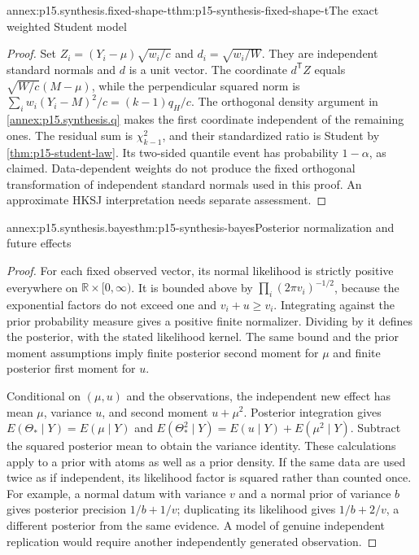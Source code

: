 \begin{annexitem}{annex:p15.synthesis.fixed-shape-t}{thm:p15-synthesis-fixed-shape-t}{The exact weighted Student model}
\begin{proof}
Set \(Z_i=(Y_i-\mu)\sqrt{w_i/c}\) and
\(d_i=\sqrt{w_i/W}\). They are independent standard normals and \(d\)
is a unit vector. The coordinate \(d^{\mathsf T}Z\) equals
\(\sqrt{W/c}(M-\mu)\), while the perpendicular squared norm is
\(\sum_iw_i(Y_i-M)^2/c=(k-1)q_H/c\).
The orthogonal density argument in \ref{annex:p15.synthesis.q} makes
the first coordinate independent of the remaining ones. The residual sum
is \(\chi^2_{k-1}\), and their standardized ratio is Student by
\ref{thm:p15-student-law}. Its two-sided quantile event has probability
\(1-\alpha\), as claimed. Data-dependent weights do not produce the
fixed orthogonal transformation of independent standard normals used in this
proof. An approximate HKSJ interpretation needs separate assessment.
\end{proof}
\end{annexitem}

\begin{annexitem}{annex:p15.synthesis.bayes}{thm:p15-synthesis-bayes}{Posterior normalization and future effects}
\begin{proof}
For each fixed observed vector, its normal likelihood is strictly positive
everywhere on \(\mathbb R\times[0,\infty)\). It is bounded above
by \(\prod_i(2\pi v_i)^{-1/2}\), because the exponential factors do
not exceed one and \(v_i+u\geq v_i\). Integrating against the prior
probability measure gives a positive finite normalizer. Dividing by it
defines the posterior, with the stated likelihood kernel. The same bound
and the prior moment assumptions imply finite posterior second moment for
\(\mu\) and finite posterior first moment for \(u\).

Conditional on \((\mu,u)\) and the observations, the independent new
effect has mean \(\mu\), variance \(u\), and second moment
\(u+\mu^2\). Posterior integration gives
\(E(\Theta_*\mid Y)=E(\mu\mid Y)\) and
\(E(\Theta_*^2\mid Y)=E(u\mid Y)+E(\mu^2\mid Y)\).
Subtract the squared posterior mean to obtain the variance identity.
These calculations apply to a prior with atoms as well as a prior density.
If the same data are used twice as if independent, its likelihood factor is
squared rather than counted once. For example, a normal datum with variance
\(v\) and a normal prior of variance \(b\) gives posterior precision
\(1/b+1/v\); duplicating its likelihood gives \(1/b+2/v\), a different
posterior from the same evidence. A model of genuine independent replication
would require another independently generated observation.
\end{proof}
\end{annexitem}

